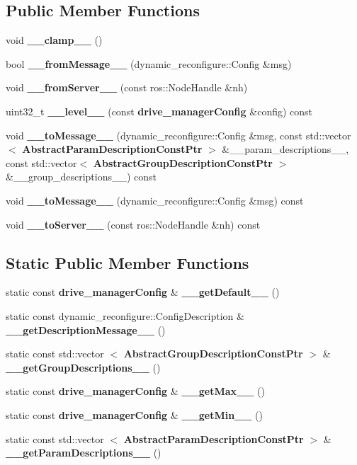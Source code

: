 \subsection*{\-Public \-Member \-Functions}
\begin{DoxyCompactItemize}
\item 
void {\bf \-\_\-\-\_\-clamp\-\_\-\-\_\-} ()
\item 
bool {\bf \-\_\-\-\_\-from\-Message\-\_\-\-\_\-} (dynamic\-\_\-reconfigure\-::\-Config \&msg)
\item 
void {\bf \-\_\-\-\_\-from\-Server\-\_\-\-\_\-} (const ros\-::\-Node\-Handle \&nh)
\item 
uint32\-\_\-t {\bf \-\_\-\-\_\-level\-\_\-\-\_\-} (const {\bf drive\-\_\-manager\-Config} \&config) const 
\item 
void {\bf \-\_\-\-\_\-to\-Message\-\_\-\-\_\-} (dynamic\-\_\-reconfigure\-::\-Config \&msg, const std\-::vector$<$ {\bf \-Abstract\-Param\-Description\-Const\-Ptr} $>$ \&\-\_\-\-\_\-param\-\_\-descriptions\-\_\-\-\_\-, const std\-::vector$<$ {\bf \-Abstract\-Group\-Description\-Const\-Ptr} $>$ \&\-\_\-\-\_\-group\-\_\-descriptions\-\_\-\-\_\-) const 
\item 
void {\bf \-\_\-\-\_\-to\-Message\-\_\-\-\_\-} (dynamic\-\_\-reconfigure\-::\-Config \&msg) const 
\item 
void {\bf \-\_\-\-\_\-to\-Server\-\_\-\-\_\-} (const ros\-::\-Node\-Handle \&nh) const 
\end{DoxyCompactItemize}
\subsection*{\-Static \-Public \-Member \-Functions}
\begin{DoxyCompactItemize}
\item 
static const {\bf drive\-\_\-manager\-Config} \& {\bf \-\_\-\-\_\-get\-Default\-\_\-\-\_\-} ()
\item 
static const \*
dynamic\-\_\-reconfigure\-::\-Config\-Description \& {\bf \-\_\-\-\_\-get\-Description\-Message\-\_\-\-\_\-} ()
\item 
static const std\-::vector\*
$<$ {\bf \-Abstract\-Group\-Description\-Const\-Ptr} $>$ \& {\bf \-\_\-\-\_\-get\-Group\-Descriptions\-\_\-\-\_\-} ()
\item 
static const {\bf drive\-\_\-manager\-Config} \& {\bf \-\_\-\-\_\-get\-Max\-\_\-\-\_\-} ()
\item 
static const {\bf drive\-\_\-manager\-Config} \& {\bf \-\_\-\-\_\-get\-Min\-\_\-\-\_\-} ()
\item 
static const std\-::vector\*
$<$ {\bf \-Abstract\-Param\-Description\-Const\-Ptr} $>$ \& {\bf \-\_\-\-\_\-get\-Param\-Descriptions\-\_\-\-\_\-} ()
\end{DoxyCompactItemize}
